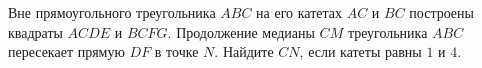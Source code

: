 \begin{ex}
	\begin{condition}
		Вне прямоугольного треугольника \( ABC \) на его катетах \( AC  \) и \( BC  \) построены квадраты \( ACDE  \) и \( BCFG \). Продолжение медианы \( CM  \) треугольника \( ABC  \) пересекает прямую \( DF  \) в точке \( N \). Найдите \( CN \), если катеты равны \( 1  \) и \( 4 \).
	\end{condition}
\end{ex}